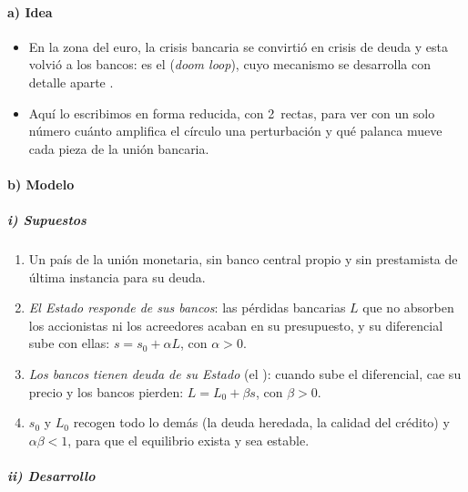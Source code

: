 \documentclass[11pt]{article}
\begin{document}
\paragraph{a) Idea}

\begin{itemize}
\item En la zona del euro, la crisis bancaria se convirtió en crisis de deuda y esta volvió a los bancos: es el  (\emph{doom loop}), cuyo mecanismo se desarrolla con detalle aparte .
\item Aquí lo escribimos en forma reducida, con 2~rectas, para ver con un solo número cuánto amplifica el círculo una perturbación y qué palanca mueve cada pieza de la unión bancaria\nocite{BrunnermeierEtAl2016,FarhiTirole2018}.
\end{itemize}

\paragraph{b) Modelo}

\subparagraph{i) Supuestos}

\begin{enumerate}
\item Un país de la unión monetaria, sin banco central propio y sin prestamista de última instancia para su deuda.
\item \emph{El Estado responde de sus bancos}: las pérdidas bancarias $L$ que no absorben los accionistas ni los acreedores acaban en su presupuesto, y su diferencial sube con ellas: $s=s_0+\alpha L$, con $\alpha>0$.
\item \emph{Los bancos tienen deuda de su Estado} (el ): cuando sube el diferencial, cae su precio y los bancos pierden: $L=L_0+\beta s$, con $\beta>0$.
\item $s_0$ y $L_0$ recogen todo lo demás (la deuda heredada, la calidad del crédito) y $\alpha\beta<1$, para que el equilibrio exista y sea estable.
\end{enumerate}

\subparagraph{ii) Desarrollo}
\end{document}
